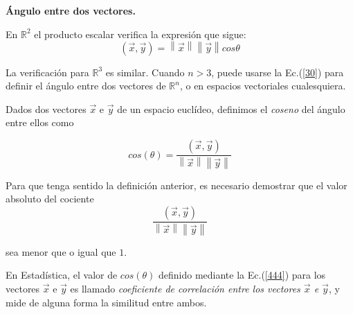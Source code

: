 \bigskip




\textbf{Ángulo entre dos vectores.}


\bigskip

En $\mathbb{R}^{2}$ el producto escalar verifica la expresión que sigue:
\begin{equation}
 (\vec{x},\vec{y})   = \left\|\vec{x}\right\|\left\|\vec{y}\right\|cos \theta
 \label{30}
\end{equation}


La verificación para $\mathbb{R}^{3}$ es similar. Cuando $n > 3$, puede usarse la Ec.(\ref{30})  para
definir el ángulo entre dos vectores de $\mathbb{R}^{n}$, o en espacios vectoriales cualesquiera. 


\bigskip

Dados dos vectores $\vec{x}$ e $\vec{y}$ de un espacio euclídeo, definimos el \textit{coseno} del ángulo  entre ellos como 

\begin{equation}
cos (\theta)=\frac {(\vec{x},\vec{y})} {\left\|\vec{x}\right\|\left\|\vec{y}\right\|} 
  \label{444}
  \end{equation}


\bigskip

Para que tenga sentido la definición anterior, es necesario demostrar que el valor absoluto del cociente
\[\frac {(\vec{x},\vec{y})} {\left\|\vec{x}\right\|\left\|\vec{y}\right\|}\] 

\bigskip
\noindent
sea menor que o igual que $1$.

\bigskip
\begin{remark}
En Estadística, el valor de $cos (\theta)$ definido mediante la Ec.(\ref{444}) para los vectores $\vec{x}$ e $\vec{y}$ es llamado  \textit{coeficiente de correlación entre los vectores $\vec{x}$ e $\vec{y}$}, y mide de alguna forma la similitud entre ambos.
\end{remark}

\bigskip

